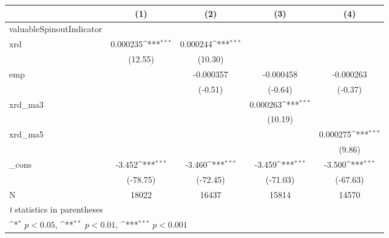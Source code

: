 {
\def\sym#1{\ifmmode^{#1}\else\(^{#1}\)\fi}
\begin{tabular}{l*{4}{c}}
\hline\hline
            &\multicolumn{1}{c}{(1)}         &\multicolumn{1}{c}{(2)}         &\multicolumn{1}{c}{(3)}         &\multicolumn{1}{c}{(4)}         \\
\hline
valuableSpinoutIndicator&                     &                     &                     &                     \\
xrd         &    0.000235\sym{***}&    0.000244\sym{***}&                     &                     \\
            &     (12.55)         &     (10.30)         &                     &                     \\
[1em]
emp         &                     &   -0.000357         &   -0.000458         &   -0.000263         \\
            &                     &     (-0.51)         &     (-0.64)         &     (-0.37)         \\
[1em]
xrd\_ma3     &                     &                     &    0.000263\sym{***}&                     \\
            &                     &                     &     (10.19)         &                     \\
[1em]
xrd\_ma5     &                     &                     &                     &    0.000275\sym{***}\\
            &                     &                     &                     &      (9.86)         \\
[1em]
\_cons      &      -3.452\sym{***}&      -3.460\sym{***}&      -3.459\sym{***}&      -3.500\sym{***}\\
            &    (-78.75)         &    (-72.45)         &    (-71.03)         &    (-67.63)         \\
\hline
N           &       18022         &       16437         &       15814         &       14570         \\
\hline\hline
\multicolumn{5}{l}{\footnotesize \textit{t} statistics in parentheses}\\
\multicolumn{5}{l}{\footnotesize \sym{*} \(p<0.05\), \sym{**} \(p<0.01\), \sym{***} \(p<0.001\)}\\
\end{tabular}
}
